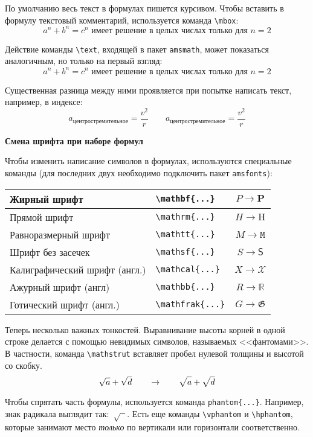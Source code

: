 \documentclass{article}
\begin{document}
По умолчанию весь текст в формулах пишется курсивом. Чтобы вставить в формулу текстовый комментарий, используется команда \verb|\mbox|:
\[
a^n+b^n=c^n \mbox{ имеет решение в целых числах только для } n=2
\]

Действие команды \verb|\text|, входящей в пакет \texttt{amsmath}, может показаться аналогичным, но только на первый взгляд:
\[
a^n+b^n=c^n \text{ имеет решение в целых числах только для } n=2
\]

Существенная разница между ними проявляется при попытке написать текст, например, в индексе:
\[
a_{\mbox{центростремительное}} = \frac{v^2}{r}  \qquad a_{\text{центростремительное}} = \frac{v^2}{r}
\]


\textbf{Смена шрифта при наборе формул}

Чтобы изменить написание символов в формулах, используются специальные команды (для последних двух необходимо подключить пакет \texttt{amsfonts}):
\begin{center}
\begin{tabular}{|l|l|c|} \hline
Жирный шрифт                  & \verb|\mathbf{...}|   &  $P \to \mathbf P$  \\ \hline
Прямой шрифт                  & \verb|\mathrm{...}|   &  $H \to \mathrm H$  \\ \hline
Равноразмерный шрифт          & \verb|\mathtt{...}|   &  $M \to \mathtt M$  \\ \hline
Шрифт без засечек             & \verb|\mathsf{...}|   &  $S \to \mathsf S$  \\ \hline
Калиграфический шрифт (англ.) & \verb|\mathcal{...}|  &  $X \to \mathcal X$ \\ \hline
Ажурный шрифт (англ)          & \verb|\mathbb{...}|   &  $R \to \mathbb R$  \\ \hline
Готический шрифт (англ.)      & \verb|\mathfrak{...}| &  $G \to \mathfrak G$\\ \hline
\end{tabular}
\end{center}

\medskip
Теперь несколько важных тонкостей.
Выравнивание высоты корней в одной строке делается с помощью невидимых символов, называемых <<фантомами>>. В частности, команда \verb|\mathstrut| вставляет пробел нулевой толщины и высотой со скобку.
\[
\sqrt{a} +\sqrt{d} \qquad \to \qquad \sqrt{\mathstrut a} + \sqrt{\mathstrut d}
\]

Чтобы спрятать часть формулы, используется команда \verb|phantom{...}|. Например, знак радикала выглядит так:~$\sqrt{\phantom{x}}$. Есть еще команды \verb|\vphantom| и \verb|\hphantom|, которые занимают место \emph{только} по вертикали или горизонтали соответственно.
\end{document}
